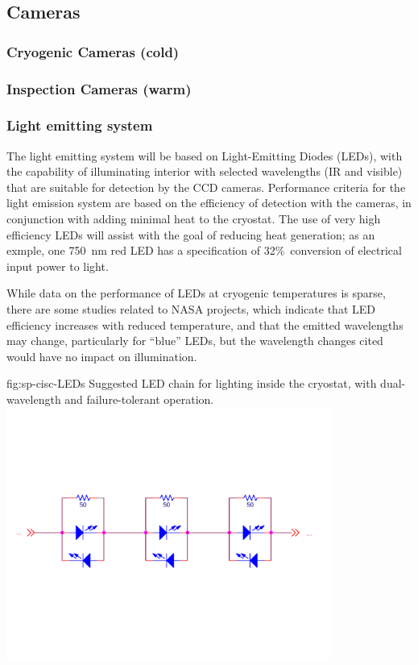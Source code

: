 \subsection{Cameras}
\label{sec:fdsp-slow-cryo-cameras}


\subsubsection{Cryogenic Cameras (cold)}

\subsubsection{Inspection Cameras (warm)}

\subsubsection{Light emitting system}
The light emitting system will be based on Light-Emitting Diodes (LEDs),
with the capability of illuminating interior with selected wavelengths
(IR and visible) that are suitable for detection by the CCD cameras.
Performance criteria for the light emission system are based on the
efficiency of detection with the cameras, in conjunction with adding
minimal heat to the cryostat. The use of very high efficiency LEDs will
assist with the goal of reducing heat generation; as an exmple, one
\SI{750}{nm}
red LED has a specification of 32\%\ conversion of
electrical input power to light. 

While data on the performance of LEDs at cryogenic temperatures is sparse,
there are some studies related to NASA projects\cite{Carron:2017zzz}, which
indicate that LED efficiency increases with reduced temperature,
and that the emitted wavelengths may change, particularly for ``blue'' LEDs,
but the wavelength changes cited would have no impact on illumination.

\begin{dunefigure}{fig:sp-cisc-LEDs}
  {Suggested LED chain for lighting inside the cryostat, with
    dual-wavelength and failure-tolerant operation.}
\includegraphics[width=0.8\textwidth]{../figures/CISC-Lighting.pdf}
\end{dunefigure}

